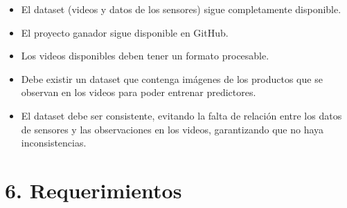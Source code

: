 \documentclass[
11pt, %
]{charter}
\begin{document}
\begin{itemize}
	\item El dataset (videos y datos de los sensores) sigue completamente disponible.
	\item El proyecto ganador sigue disponible en GitHub.
	\item Los videos disponibles deben tener un formato procesable.
	\item Debe existir un dataset que contenga imágenes de los productos que se observan en los videos para poder entrenar predictores.
	\item El dataset debe ser consistente, evitando la falta de relación entre los datos de sensores y las observaciones en los videos, garantizando que no haya inconsistencias.
\end{itemize}


\section{6. Requerimientos}
\label{sec:requerimientos}
\end{document}
